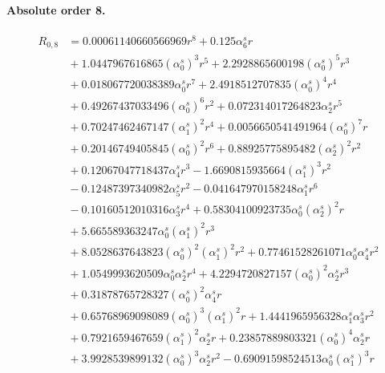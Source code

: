 \documentclass[10pt]{article}
\begin{document}
\paragraph{Absolute order 8.}
\begin{align*}
R_{0,8} &= 0.00061140660566969 r^{8} + 0.125 \alpha_{6}^s r \\
&{}  + 1.0447967616865 \left(\alpha_{0}^s\right)^{3} r^{5} + 2.2928865600198 \left(\alpha_{0}^s\right)^{5} r^{3} \\
&{}  + 0.018067720038389 \alpha_{0}^s r^{7} + 2.4918512707835 \left(\alpha_{0}^s\right)^{4} r^{4} \\
&{}  + 0.49267437033496 \left(\alpha_{0}^s\right)^{6} r^{2} + 0.072314017264823 \alpha_{2}^s r^{5} \\
&{}  + 0.70247462467147 \left(\alpha_{1}^s\right)^{2} r^{4} + 0.0056650541491964 \left(\alpha_{0}^s\right)^{7} r \\
&{}  + 0.20146749405845 \left(\alpha_{0}^s\right)^{2} r^{6} + 0.88925775895482 \left(\alpha_{2}^s\right)^{2} r^{2} \\
&{}  + 0.12067047718437 \alpha_{4}^s r^{3} - 1.6690815935664 \left(\alpha_{1}^s\right)^{3} r^{2} \\
&{}  - 0.12487397340982 \alpha_{5}^s r^{2} - 0.041647970158248 \alpha_{1}^s r^{6} \\
&{}  - 0.10160512010316 \alpha_{3}^s r^{4} + 0.58304100923735 \alpha_{0}^s \left(\alpha_{2}^s\right)^{2} r \\
&{}  + 5.665589363247 \alpha_{0}^s \left(\alpha_{1}^s\right)^{2} r^{3} \\
&{}  + 8.0528637643823 \left(\alpha_{0}^s\right)^{2} \left(\alpha_{1}^s\right)^{2} r^{2} + 0.77461528261071 \alpha_{0}^s \alpha_{4}^s r^{2} \\
&{}  + 1.0549993620509 \alpha_{0}^s \alpha_{2}^s r^{4} + 4.2294720827157 \left(\alpha_{0}^s\right)^{2} \alpha_{2}^s r^{3} \\
&{}  + 0.31878765728327 \left(\alpha_{0}^s\right)^{2} \alpha_{4}^s r \\
&{}  + 0.65768969098089 \left(\alpha_{0}^s\right)^{3} \left(\alpha_{1}^s\right)^{2} r + 1.4441965956328 \alpha_{1}^s \alpha_{3}^s r^{2} \\
&{}  + 0.7921659467659 \left(\alpha_{1}^s\right)^{2} \alpha_{2}^s r + 0.23857889803321 \left(\alpha_{0}^s\right)^{4} \alpha_{2}^s r \\
&{}  + 3.9928539899132 \left(\alpha_{0}^s\right)^{3} \alpha_{2}^s r^{2} - 0.69091598524513 \alpha_{0}^s \left(\alpha_{1}^s\right)^{3} r \\

\end{align*}
\end{document}
